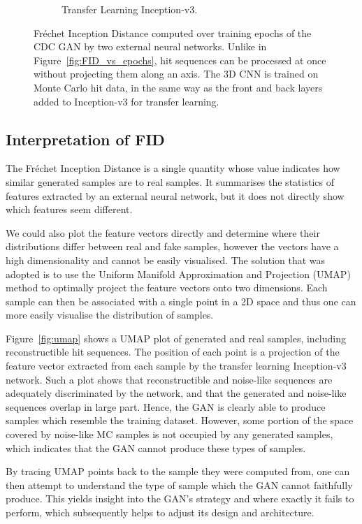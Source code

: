 \begin{figure}
\begin{subfigure}[t]{0.4\textwidth}
        \caption{ 
            Transfer Learning Inception-v3.
        }
        \label{fig:transfer_learning_FID_vs_epochs}
    \end{subfigure}
    \caption{
        Fréchet Inception Distance computed over training epochs of the CDC GAN
        by two external neural networks. Unlike in
        Figure~\ref{fig:FID_vs_epochs}, hit sequences can be processed at once
        without projecting them along an axis. The 3D CNN is trained on
        Monte Carlo hit data, in the same way as the front and back layers added
        to Inception-v3 for transfer learning.
    }
\end{figure}

\subsection{Interpretation of FID}
The Fréchet Inception Distance is a single quantity whose value indicates how
similar generated samples are to real samples. It summarises the statistics of
features extracted by an external neural network, but it does not directly show
which features seem different.

We could also plot the feature vectors directly and determine where their
distributions differ between real and fake samples, however the vectors have a
high dimensionality and cannot be easily visualised. The solution that was
adopted is to use the Uniform Manifold Approximation and Projection
(UMAP)~\cite{umap} method to optimally project the feature vectors onto two
dimensions. Each sample can then be associated with a single point in a 2D space
and thus one can more easily visualise the distribution of samples. 

Figure~\ref{fig:umap} shows a UMAP plot of generated and real samples, including
reconstructible hit sequences. The position of each point is a projection of the
feature vector extracted from each sample by the transfer learning Inception-v3
network. Such a plot shows that reconstructible and noise-like sequences are
adequately discriminated by the network, and that the generated and noise-like
sequences overlap in large part. Hence, the GAN is clearly able to produce
samples which resemble the training dataset. However, some portion of the space
covered by noise-like MC samples is not occupied by any generated samples, which
indicates that the GAN cannot produce these types of samples.

By tracing UMAP points back to the sample they were computed from, one can then
attempt to understand the type of sample which the GAN cannot faithfully
produce. This yields insight into the GAN's strategy and where exactly it fails
to perform, which subsequently helps to adjust its design and architecture.


